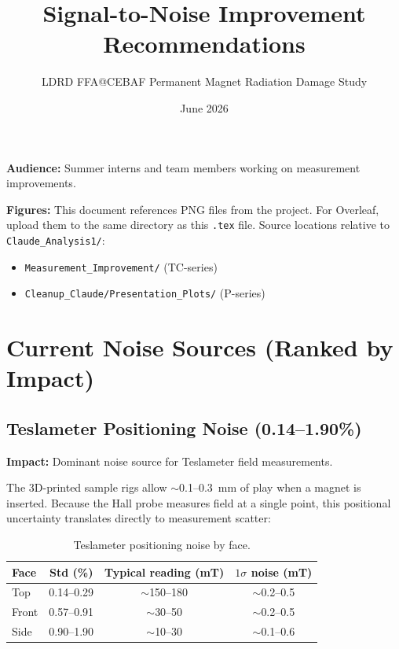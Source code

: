 \documentclass[11pt,letterpaper]{article}
\title{Signal-to-Noise Improvement Recommendations}
\author{LDRD FFA@CEBAF Permanent Magnet Radiation Damage Study}
\date{June 2026}
\begin{document}
\maketitle

\noindent\textbf{Audience:} Summer interns and team members working on
measurement improvements.

\bigskip\noindent\textbf{Figures:} This document references PNG files from the
project. For Overleaf, upload them to the same directory as this \texttt{.tex}
file. Source locations relative to \texttt{Claude\_Analysis1/}:
\begin{itemize}[nosep]
  \item \texttt{Measurement\_Improvement/} (TC-series)
  \item \texttt{Cleanup\_Claude/Presentation\_Plots/} (P-series)
\end{itemize}

\tableofcontents
\newpage

\section{Current Noise Sources (Ranked by Impact)}
\label{sec:noise}

\subsection{Teslameter Positioning Noise (0.14--1.90\%)}
\label{sec:noise-positioning}

\textbf{Impact:} Dominant noise source for Teslameter field measurements.

The 3D-printed sample rigs allow ${\sim}$0.1--\SI{0.3}{\milli\meter} of play
when a magnet is inserted. Because the Hall probe measures field at a single
point, this positional uncertainty translates directly to measurement scatter:

\begin{table}[htbp]
\centering
\caption{Teslameter positioning noise by face.}
\label{tab:positioning-noise}
\begin{tabular}{@{}lccc@{}}
\toprule
Face & Std (\%) & Typical reading (mT) & $1\sigma$ noise (mT) \\
\midrule
Top   & 0.14--0.29 & ${\sim}$150--180 & ${\sim}$0.2--0.5 \\
Front & 0.57--0.91 & ${\sim}$30--50   & ${\sim}$0.2--0.5 \\
Side  & 0.90--1.90 & ${\sim}$10--30   & ${\sim}$0.1--0.6 \\
\bottomrule
\end{tabular}
\end{table}
\end{document}
